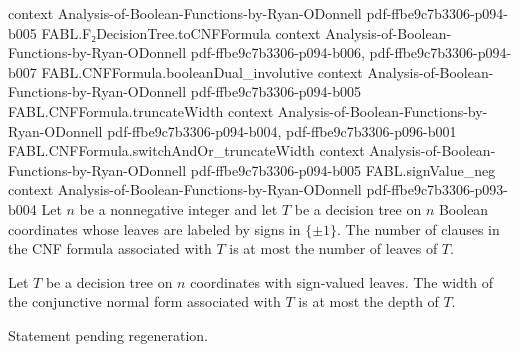 \begin{theorem}
  {context}
  {Analysis-of-Boolean-Functions-by-Ryan-ODonnell}
  {pdf-ffbe9c7b3306-p094-b005}
\proofstep
  {FABL.F₂DecisionTree.toCNFFormula}
  {context}
  {Analysis-of-Boolean-Functions-by-Ryan-ODonnell}
  {pdf-ffbe9c7b3306-p094-b006,
    pdf-ffbe9c7b3306-p094-b007}
\proofstep
  {FABL.CNFFormula.booleanDual_involutive}
  {context}
  {Analysis-of-Boolean-Functions-by-Ryan-ODonnell}
  {pdf-ffbe9c7b3306-p094-b005}
\proofstep
  {FABL.CNFFormula.truncateWidth}
  {context}
  {Analysis-of-Boolean-Functions-by-Ryan-ODonnell}
  {pdf-ffbe9c7b3306-p094-b004,
    pdf-ffbe9c7b3306-p096-b001}
\proofstep
  {FABL.CNFFormula.switchAndOr_truncateWidth}
  {context}
  {Analysis-of-Boolean-Functions-by-Ryan-ODonnell}
  {pdf-ffbe9c7b3306-p094-b005}
\proofstep
  {FABL.signValue_neg}
  {context}
  {Analysis-of-Boolean-Functions-by-Ryan-ODonnell}
  {pdf-ffbe9c7b3306-p093-b004}
Let $n$ be a nonnegative integer and let $T$ be a decision tree on $n$ Boolean
coordinates whose leaves are labeled by signs in $\{\pm1\}$. The number of clauses in
the CNF formula associated with $T$ is at most the number of leaves of $T$.
\end{theorem}

\begin{theorem}
\leanok
{}
Let $T$ be a decision tree on $n$ coordinates with sign-valued leaves. The width of the
conjunctive normal form associated with $T$ is at most the depth of $T$.
\end{theorem}

\begin{theorem}
\leanok
{}
Statement pending regeneration.
\end{theorem}

